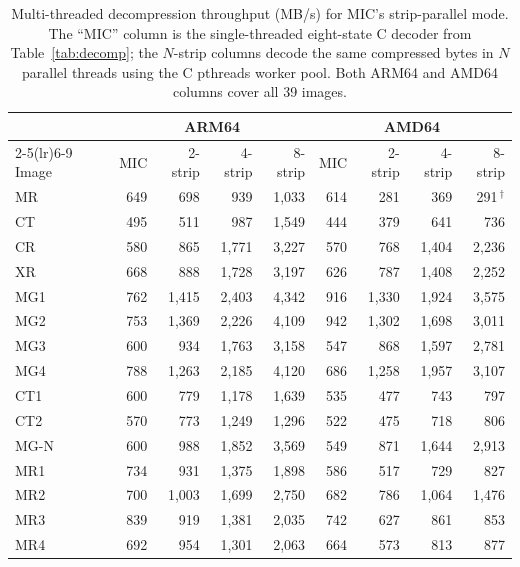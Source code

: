 \documentclass[journal]{IEEEtran}
\begin{document}
\begin{table}[htbp]
\centering
\caption{Multi-threaded decompression throughput (MB/s) for MIC's
strip-parallel mode. The ``MIC'' column is the single-threaded eight-state
C decoder from Table~\ref{tab:decomp}; the $N$-strip columns decode the same
compressed bytes in $N$ parallel threads using the C pthreads worker pool.
Both ARM64 and AMD64 columns cover all 39 images.}
\label{tab:pics}
\scriptsize
\begin{tabular}{l|rrrr|rrrr}
\toprule
 & \multicolumn{4}{c|}{ARM64} & \multicolumn{4}{c}{AMD64} \\
\cmidrule(lr){2-5}\cmidrule(lr){6-9}
Image & MIC & 2-strip & 4-strip & 8-strip & MIC & 2-strip & 4-strip & 8-strip \\
\midrule
MR                   & 649 & 698 & 939 & 1{,}033 & 614 & 281 & 369 & 291\,$^\dagger$ \\
CT                   & 495 & 511 & 987 & 1{,}549 & 444 & 379 & 641 & 736 \\
CR                   & 580 & 865 & 1{,}771 & 3{,}227 & 570 & 768 & 1{,}404 & 2{,}236 \\
XR                   & 668 & 888 & 1{,}728 & 3{,}197 & 626 & 787 & 1{,}408 & 2{,}252 \\
MG1                  & 762 & 1{,}415 & 2{,}403 & 4{,}342 & 916 & 1{,}330 & 1{,}924 & 3{,}575 \\
MG2                  & 753 & 1{,}369 & 2{,}226 & 4{,}109 & 942 & 1{,}302 & 1{,}698 & 3{,}011 \\
MG3                  & 600 & 934 & 1{,}763 & 3{,}158 & 547 & 868 & 1{,}597 & 2{,}781 \\
MG4                  & 788 & 1{,}263 & 2{,}185 & 4{,}120 & 686 & 1{,}258 & 1{,}957 & 3{,}107 \\
CT1                  & 600 & 779 & 1{,}178 & 1{,}639 & 535 & 477 & 743 & 797 \\
CT2                  & 570 & 773 & 1{,}249 & 1{,}296 & 522 & 475 & 718 & 806 \\
MG-N                 & 600 & 988 & 1{,}852 & 3{,}569 & 549 & 871 & 1{,}644 & 2{,}913 \\
MR1                  & 734 & 931 & 1{,}375 & 1{,}898 & 586 & 517 & 729 & 827 \\
MR2                  & 700 & 1{,}003 & 1{,}699 & 2{,}750 & 682 & 786 & 1{,}064 & 1{,}476 \\
MR3                  & 839 & 919 & 1{,}381 & 2{,}035 & 742 & 627 & 861 & 853 \\
MR4                  & 692 & 954 & 1{,}301 & 2{,}063 & 664 & 573 & 813 & 877 \\

\end{tabular}
\end{table}
\end{document}
